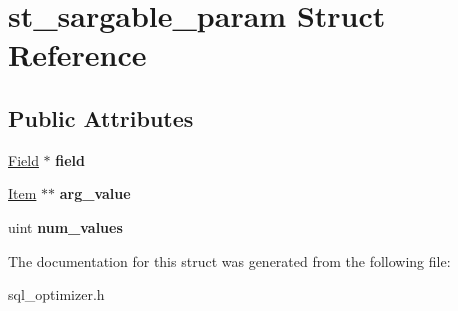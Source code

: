 \hypertarget{structst__sargable__param}{}\section{st\+\_\+sargable\+\_\+param Struct Reference}
\label{structst__sargable__param}
\subsection*{Public Attributes}
\begin{DoxyCompactItemize}
\item 
\mbox{\label{structst__sargable__param_a8eafc594e5b98af7b7800491d1acad1b}} 
\mbox{\hyperlink{classField}{Field}} $\ast$ {\bfseries field}
\item 
\mbox{\label{structst__sargable__param_a80f1b71ebf8b37c85514e3e2114c9af8}} 
\mbox{\hyperlink{classItem}{Item}} $\ast$$\ast$ {\bfseries arg\+\_\+value}
\item 
\mbox{\label{structst__sargable__param_aefb7aae7f0a1cadfb39cd7c789a3a7a7}} 
uint {\bfseries num\+\_\+values}
\end{DoxyCompactItemize}


The documentation for this struct was generated from the following file\+:\begin{DoxyCompactItemize}
\item 
sql\+\_\+optimizer.\+h\end{DoxyCompactItemize}
